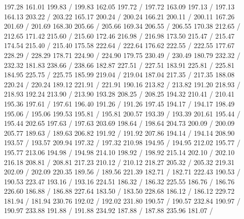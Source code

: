 { 197.28 161.01 199.83 /
 199.83 162.05 197.72 /
 197.72 163.09 197.13 /
 197.13 164.13 203.22 /
 203.22 165.17 200.24 /
 200.24 166.21 200.11 /
 200.11 167.26 201.69 /
 201.69 168.30 205.66 /
 205.66 169.34 206.55 /
 206.55 170.38 212.65 /
 212.65 171.42 215.60 /
 215.60 172.46 216.98 /
 216.98 173.50 215.47 /
 215.47 174.54 215.40 /
 215.40 175.58 222.64 /
 222.64 176.62 222.55 /
 222.55 177.67 228.29 /
 228.29 178.71 224.90 /
 224.90 179.75 230.49 /
 230.49 180.79 232.32 /
 232.32 181.83 238.66 /
 238.66 182.87 227.51 /
 227.51 183.91 225.81 /
 225.81 184.95 225.75 /
 225.75 185.99 219.04 /
 219.04 187.04 217.35 /
 217.35 188.08 220.24 /
 220.24 189.12 221.91 /
 221.91 190.16 213.82 /
 213.82 191.20 218.93 /
 218.93 192.24 213.90 /
 213.90 193.28 208.25 /
 208.25 194.32 210.41 /
 210.41 195.36 197.61 /
 197.61 196.40 191.26 /
 191.26 197.45 194.17 /
 194.17 198.49 195.06 /
 195.06 199.53 195.81 /
 195.81 200.57 193.39 /
 193.39 201.61 195.44 /
 195.44 202.65 197.63 /
 197.63 203.69 198.64 /
 198.64 204.73 200.09 /
 200.09 205.77 189.63 /
 189.63 206.82 191.92 /
 191.92 207.86 194.14 /
 194.14 208.90 193.57 /
 193.57 209.94 197.32 /
 197.32 210.98 194.95 /
 194.95 212.02 195.77 /
 195.77 213.06 194.98 /
 194.98 214.10 198.92 /
 198.92 215.14 202.10 /
 202.10 216.18 208.81 /
 208.81 217.23 210.12 /
 210.12 218.27 205.32 /
 205.32 219.31 202.09 /
 202.09 220.35 189.56 /
 189.56 221.39 182.71 /
 182.71 222.43 190.53 /
 190.53 223.47 193.16 /
 193.16 224.51 186.32 /
 186.32 225.55 186.76 /
 186.76 226.60 186.88 /
 186.88 227.64 183.50 /
 183.50 228.68 186.12 /
 186.12 229.72 181.94 /
 181.94 230.76 192.02 /
 192.02 231.80 190.57 /
 190.57 232.84 190.97 /
 190.97 233.88 191.88 /
 191.88 234.92 187.88 /
 187.88 235.96 181.07 /
}
